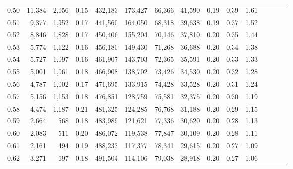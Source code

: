 \begin{tabular}{rrrcrrrrrrrrrrr}
0.50 &  11,384 &   2,056 &                                       0.15 &  432,183 &  173,427 &   66,366 &  41,590 &  0.19 &  0.39 &                         1.61 \\
0.51 &   9,377 &   1,952 &                                       0.17 &  441,560 &  164,050 &   68,318 &  39,638 &  0.19 &  0.37 &                         1.52 \\
0.52 &   8,846 &   1,828 &                                       0.17 &  450,406 &  155,204 &   70,146 &  37,810 &  0.20 &  0.35 &                         1.44 \\
0.53 &   5,774 &   1,122 &                                       0.16 &  456,180 &  149,430 &   71,268 &  36,688 &  0.20 &  0.34 &                         1.38 \\
0.54 &   5,727 &   1,097 &                                       0.16 &  461,907 &  143,703 &   72,365 &  35,591 &  0.20 &  0.33 &                         1.33 \\
0.55 &   5,001 &   1,061 &                                       0.18 &  466,908 &  138,702 &   73,426 &  34,530 &  0.20 &  0.32 &                         1.28 \\
0.56 &   4,787 &   1,002 &                                       0.17 &  471,695 &  133,915 &   74,428 &  33,528 &  0.20 &  0.31 &                         1.24 \\
0.57 &   5,156 &   1,153 &                                       0.18 &  476,851 &  128,759 &   75,581 &  32,375 &  0.20 &  0.30 &                         1.19 \\
0.58 &   4,474 &   1,187 &                                       0.21 &  481,325 &  124,285 &   76,768 &  31,188 &  0.20 &  0.29 &                         1.15 \\
0.59 &   2,664 &     568 &                                       0.18 &  483,989 &  121,621 &   77,336 &  30,620 &  0.20 &  0.28 &                         1.13 \\
0.60 &   2,083 &     511 &                                       0.20 &  486,072 &  119,538 &   77,847 &  30,109 &  0.20 &  0.28 &                         1.11 \\
0.61 &   2,161 &     494 &                                       0.19 &  488,233 &  117,377 &   78,341 &  29,615 &  0.20 &  0.27 &                         1.09 \\
0.62 &   3,271 &     697 &                                       0.18 &  491,504 &  114,106 &   79,038 &  28,918 &  0.20 &  0.27 &                         1.06 \\

\end{tabular}
